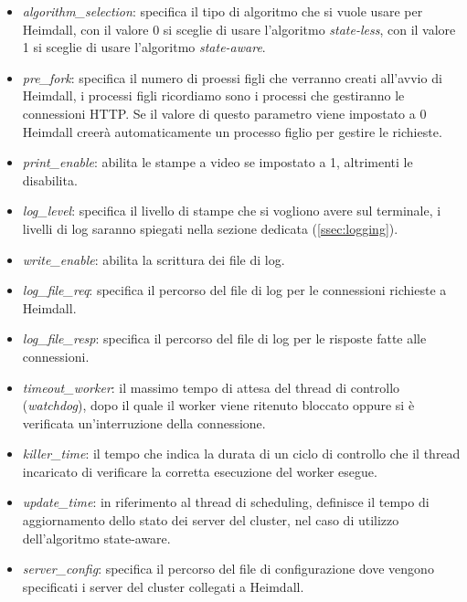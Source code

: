 \documentclass[italian]{tktltiki2}
\begin{document}
\begin{itemize}
	\item \emph{algorithm\_selection}: specifica il tipo di algoritmo che si vuole usare per Heimdall, con il valore 0 si sceglie di usare l'algoritmo \emph{state-less}, con il valore 1 si sceglie di usare l'algoritmo \emph{state-aware}.

	\item \emph{pre\_fork}: specifica il numero di proessi figli che verranno creati all'avvio di Heimdall, i processi figli ricordiamo sono i processi che gestiranno le connessioni HTTP. Se il valore di questo parametro viene impostato a 0 Heimdall creerà automaticamente un processo figlio per gestire le richieste.
	
	\item \emph{print\_enable}: abilita le stampe a video se impostato a 1, altrimenti le disabilita.
		
	\item \emph{log\_level}: specifica il livello di stampe che si vogliono avere sul terminale, i livelli di log saranno spiegati nella sezione dedicata (\ref{ssec:logging}).
	
	\item \emph{write\_enable}: abilita la scrittura dei file di log.
 	
	\item \emph{log\_file\_req}: specifica il percorso del file di log per le connessioni richieste a Heimdall.
		
	\item \emph{log\_file\_resp}: specifica il percorso del file di log per le risposte fatte alle connessioni.
		
	\item \emph{timeout\_worker}: il massimo tempo di attesa del thread di controllo (\emph{watchdog}), dopo il quale il worker viene ritenuto bloccato oppure si è verificata un'interruzione della connessione.
	
	\item \emph{killer\_time}: il tempo che indica la durata di un ciclo di controllo che il thread incaricato di verificare la corretta esecuzione del worker esegue.
	
	\item \emph{update\_time}: in riferimento al thread di scheduling, definisce il tempo di aggiornamento dello stato dei server del cluster, nel caso di utilizzo dell'algoritmo state-aware. 
	
	\item \emph{server\_config}: specifica il percorso del file di configurazione dove vengono specificati i server del cluster collegati a Heimdall.
	

\end{itemize}
\end{document}
